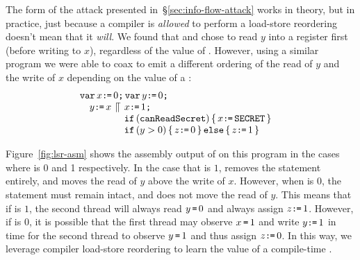 \documentclass[conference]{IEEEtran}
\theoremstyle{plain}
\theoremstyle{definition}
\newcommand{\ignore}[1]{}
\begin{document}
The form of the attack presented in~\S\ref{sec:info-flow-attack} works in
theory, but in practice, just because a compiler is \emph{allowed} to perform a
load-store reordering doesn't mean that it \emph{will}.
We found that {\GCC} and {\CLANG} chose to read $y$ into a
register first (before writing to $x$), regardless of the value of
{\SEC}.
However, using a similar program we were able to coax {\GCC} to emit a
different ordering of the read of $y$ and the write of $x$ depending
on the value of a {\SEC}:
\[\begin{array}[t]{@{}l}
  \VAR x\GETS0\SEMI \VAR y\GETS0\SEMI\\\quad
    y\GETS x
  \PAR\begin{array}[t]{@{}l}
    x\GETS 1\SEMI\\
    \IF(\texttt{canReadSecret})\THEN x\GETS\SEC\FI\\
    \IF(y > 0)\THEN z\GETS 0 \ELSE z\GETS 1\FI
\end{array}\end{array}\]
\ignore{
\begin{verbatim}
    x := 0; y := 0;
    (
      y := x;
    ) || (
      x := 1;
      if(canReadSecret) { x = SECRET; }
      if (y) { return 0; }
      else { return 1; }
    )
\end{verbatim}
}

Figure~\ref{fig:lsr-asm} shows the assembly output of {\GCC} on this program in the cases
where {\SEC} is 0 and 1 respectively.
In the case that {\SEC} is $1$, {\GCC} removes the \IF
statement entirely, and moves the read of $y$ above the write of $x$.
However, when {\SEC} is $0$, the \IF statement must remain
intact, and {\GCC} does not move the read of $y$.
This means that if {\SEC} is $1$, the second thread will always
read $y\,\texttt{=}\,0$ and always assign $z\texttt{:}\mkern-1mu\texttt{=}\,1$.
However, if {\SEC} is $0$, it is possible that the first thread
may observe $x\,\texttt{=}\,1$ and write $y\texttt{:}\mkern-1mu\texttt{=}\,1$ in time for the second thread
to observe $y\,\texttt{=}\,1$ and thus assign $z\texttt{:}\mkern-1mu\texttt{=}\,0$.
In this way, we leverage compiler load-store reordering to learn the value of
a compile-time {\SEC}.
\end{document}
